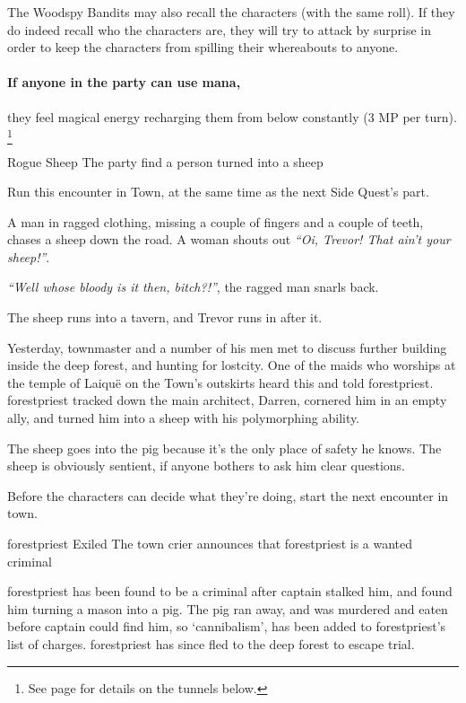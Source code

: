 \begin{multicols}{2}
The Woodspy Bandits may also recall the characters (with the same roll).
If they do indeed recall who the characters are, they will try to attack by surprise in order to keep the characters from spilling their whereabouts to anyone.

\paragraph{If anyone in the party can use mana,}
they feel magical energy recharging them from below constantly (3 MP per turn).%
\footnote{See page \pageref{underGreenTower} for details on the tunnels below.}

{Rogue Sheep}%
{The party find a person turned into a sheep}%

Run this encounter in Town, at the same time as the next Side Quest's part.

\begin{boxtext}

  A man in ragged clothing, missing a couple of fingers and a couple of teeth, chases a sheep down the road.  A woman shouts out \emph{``Oi, Trevor! That ain't your sheep!''}.

  \emph{``Well whose bloody is it then, bitch?!''}, the ragged man snarls back.

  The sheep runs into a tavern, and Trevor runs in after it.

\end{boxtext}

Yesterday, \gls{townmaster} and a number of his men met to discuss further building inside the deep forest, and hunting for \gls{lostcity}.
One of the maids who worships at the temple of Laiqu\"{e} on the Town's outskirts heard this and told \gls{forestpriest}.
\Gls{forestpriest} tracked down the main architect, Darren, cornered him in an empty ally, and turned him into a sheep with his polymorphing ability.

The sheep goes into the \gls{pig} because it's the only place of safety he knows.  The sheep is obviously sentient, if anyone bothers to ask him clear questions.

Before the characters can decide what they're doing, start the next encounter in \gls{town}.

{\Gls{forestpriest} Exiled}%
{The town crier announces that \gls{forestpriest} is a wanted criminal}%

\Gls{forestpriest} has been found to be a criminal after \gls{captain} stalked him, and found him turning a mason into a pig.
The pig ran away, and was murdered and eaten before \gls{captain} could find him, so `cannibalism', has been added to \gls{forestpriest}'s list of charges.
\Gls{forestpriest} has since fled to the deep forest to escape trial.


\end{multicols}

